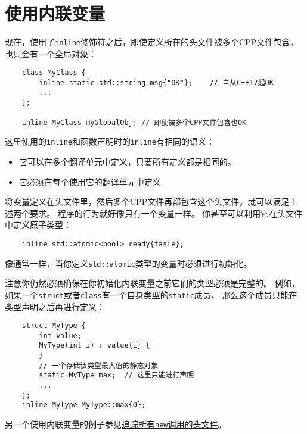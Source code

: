 \section{使用内联变量}
现在，使用了\texttt{inline}修饰符之后，即使定义所在的头文件被多个CPP文件包含，
也只会有一个全局对象：
\begin{lstlisting}
    class MyClass {
        inline static std::string msg{"OK"};    // 自从C++17起OK
        ...
    };

    inline MyClass myGlobalObj; // 即使被多个CPP文件包含也OK
\end{lstlisting}
这里使用的\texttt{inline}和函数声明时的\texttt{inline}有相同的语义：
\begin{itemize}
    \item 它可以在多个翻译单元中定义，只要所有定义都是相同的。
    \item 它必须在每个使用它的翻译单元中定义
\end{itemize}
将变量定义在头文件里，然后多个CPP文件再都包含这个头文件，就可以满足上述两个要求。
程序的行为就好像只有一个变量一样。
你甚至可以利用它在头文件中定义原子类型：
\begin{lstlisting}
    inline std::atomic<bool> ready{fasle};
\end{lstlisting}
像通常一样，当你定义\texttt{std::atomic}类型的变量时必须进行初始化。

注意你仍然必须确保在你初始化内联变量之前它们的类型必须是完整的。
例如，如果一个\texttt{struct}或者\texttt{class}有一个自身类型的\texttt{static}成员，
那么这个成员只能在类型声明之后再进行定义：
\begin{lstlisting}
    struct MyType {
        int value;
        MyType(int i) : value{i} {
        }
        // 一个存储该类型最大值的静态对象
        static MyType max;  // 这里只能进行声明
        ...
    };
    inline MyType MyType::max{0};
\end{lstlisting}
另一个使用内联变量的例子参见\hyperref[ch30.4]{追踪所有\texttt{new}调用的头文件}。

